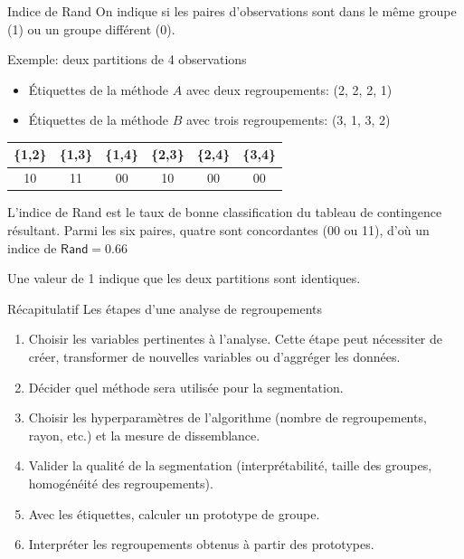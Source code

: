 \documentclass[
  ignorenonframetext,
]{beamer}
\providecommand{\tightlist}{%
  \setlength{\itemsep}{0pt}\setlength{\parskip}{0pt}}\usepackage{longtable,booktabs,array}
\begin{document}
\begin{frame}{Indice de Rand}
\protect\hypertarget{indice-de-rand}{}
On indique si les paires d'observations sont dans le même groupe (1) ou
un groupe différent (0).

Exemple: deux partitions de 4 observations

\begin{itemize}
\tightlist
\item
  Étiquettes de la méthode \(A\) avec deux regroupements: (2, 2, 2, 1)
\item
  Étiquettes de la méthode \(B\) avec trois regroupements: (3, 1, 3, 2)
\end{itemize}

\begin{longtable}[]{@{}cccccc@{}}
\toprule()
\{1,2\} & \{1,3\} & \{1,4\} & \{2,3\} & \{2,4\} & \{3,4\} \\
\midrule()
\endhead
10 & 11 & 00 & 10 & 00 & 00 \\
\bottomrule()
\end{longtable}

L'indice de Rand est le taux de bonne classification du tableau de
contingence résultant. Parmi les six paires, quatre sont concordantes
(00 ou 11), d'où un indice de \(\textsf{Rand} = 0.66\)

Une valeur de 1 indique que les deux partitions sont identiques.
\end{frame}

\begin{frame}{Récapitulatif}
\protect\hypertarget{ruxe9capitulatif}{}
Les étapes d'une analyse de regroupements

\begin{enumerate}
\tightlist
\item
  Choisir les variables pertinentes à l'analyse. Cette étape peut
  nécessiter de créer, transformer de nouvelles variables ou d'aggréger
  les données.
\item
  Décider quel méthode sera utilisée pour la segmentation.
\item
  Choisir les hyperparamètres de l'algorithme (nombre de regroupements,
  rayon, etc.) et la mesure de dissemblance.
\item
  Valider la qualité de la segmentation (interprétabilité, taille des
  groupes, homogénéité des regroupements).
\item
  Avec les étiquettes, calculer un prototype de groupe.
\item
  Interpréter les regroupements obtenus à partir des prototypes.
\end{enumerate}
\end{frame}
\end{document}
